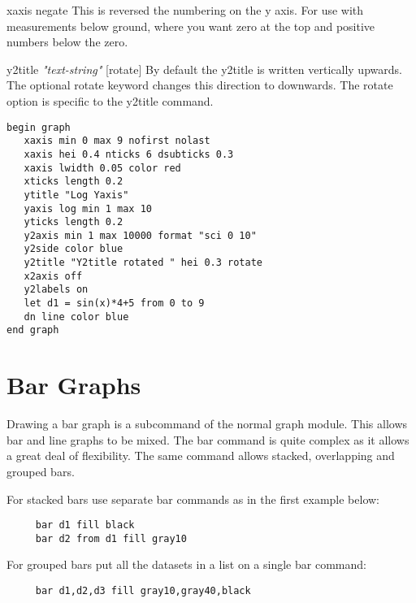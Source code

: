 \begin{commanddescription}
\item[{\sf xaxis negate}  ]
This is reversed the numbering on the y axis.  For use with
measurements below ground, where you want zero at the top and
positive numbers below the zero.

\item[{\sf y2title {\it "text-string"}  [rotate]  }  ]
By default the y2title is written vertically upwards.  The optional
{\sf rotate} keyword changes this direction to downwards.  The {\sf rotate} option
is specific to the {\sf y2title} command.

\begin{minipage}[c]{8cm}
\begin{Verbatim}
begin graph
   xaxis min 0 max 9 nofirst nolast
   xaxis hei 0.4 nticks 6 dsubticks 0.3
   xaxis lwidth 0.05 color red
   xticks length 0.2
   ytitle "Log Yaxis"
   yaxis log min 1 max 10
   yticks length 0.2
   y2axis min 1 max 10000 format "sci 0 10"
   y2side color blue
   y2title "Y2title rotated " hei 0.3 rotate
   x2axis off
   y2labels on
   let d1 = sin(x)*4+5 from 0 to 9 
   dn line color blue
end graph
\end{Verbatim}
\end{minipage}
\hfill
\begin{minipage}[c]{7cm}
\mbox{}
\end{minipage}

\end{commanddescription}

\section{Bar Graphs}
Drawing a bar graph is a subcommand of the normal graph module. This allows
bar and line graphs to be mixed.
The bar command is quite complex as it allows a
great deal of flexibility.  The same command allows stacked, overlapping and
grouped bars.

For stacked bars use separate bar commands as in the first
example below:

\preglecode{}
\begin{Verbatim}
     bar d1 fill black
     bar d2 from d1 fill gray10
\end{Verbatim}
\postglecode{}

For grouped bars put all the datasets in a list on a single bar
command:

\preglecode{}
\begin{Verbatim}
     bar d1,d2,d3 fill gray10,gray40,black
\end{Verbatim}
\postglecode{}


